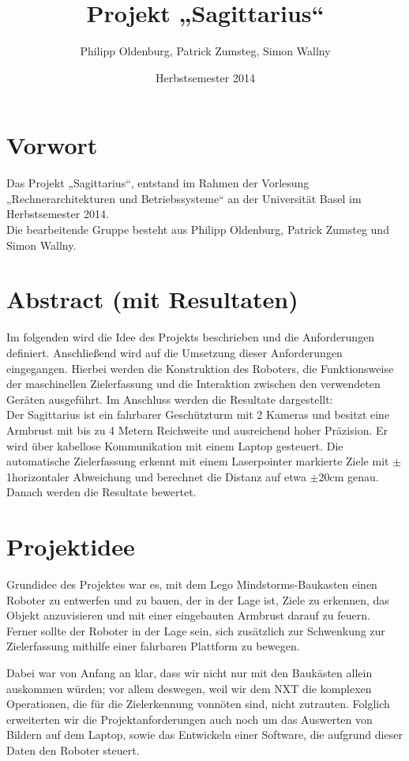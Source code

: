 \documentclass[12pt,a4paper]{article}
\author{Philipp Oldenburg, Patrick Zumsteg, Simon Wallny}
\title{Projekt „Sagittarius“}
\date{Herbstsemester 2014}
\begin{document}
\maketitle
\tableofcontents
\section{Vorwort}
Das Projekt „Sagittarius“, entstand im Rahmen der Vorlesung „Rechnerarchitekturen und Betriebssysteme“ an der Universität Basel im Herbstsemester 2014.\hfill\\
Die bearbeitende Gruppe besteht aus Philipp Oldenburg, Patrick Zumsteg und Simon Wallny.
\newpage
\section{Abstract (mit Resultaten)}
Im folgenden wird die Idee des Projekts beschrieben und die Anforderungen definiert. Anschließend wird auf die Umsetzung dieser Anforderungen eingegangen. Hierbei werden die Konstruktion des Roboters, die Funktionsweise der maschinellen Zielerfassung und die Interaktion zwischen den verwendeten Geräten ausgeführt. Im Anschluss werden die Resultate dargestellt:\hfill\\
Der Sagittarius ist ein fahrbarer Geschützturm mit 2 Kameras und besitzt eine Armbrust mit bis zu 4 Metern Reichweite und ausreichend hoher Präzision. Er wird über kabellose Kommunikation mit einem Laptop gesteuert. Die automatische Zielerfassung erkennt mit einem Laserpointer markierte Ziele mit $\pm$1\degree horizontaler Abweichung und berechnet die Distanz auf etwa $\pm$20cm genau.\hfill\\
Danach werden die Resultate bewertet.

\section{Projektidee}

Grundidee des Projektes war es, mit dem Lego Mindstorms-Baukasten einen Roboter zu entwerfen und zu bauen, der in der Lage ist, Ziele zu erkennen, das Objekt anzuvisieren und mit einer eingebauten Armbrust darauf zu feuern.
Ferner sollte der Roboter in der Lage sein, sich zusätzlich zur Schwenkung zur Zielerfassung mithilfe einer fahrbaren Plattform zu bewegen.

Dabei war von Anfang an klar, dass wir nicht nur mit den Baukästen allein auskommen würden; vor allem deswegen, weil wir dem NXT die komplexen Operationen, die für die Zielerkennung vonnöten sind, nicht zutrauten. Folglich erweiterten wir die Projektanforderungen auch noch um das Auswerten von Bildern auf dem Laptop, sowie das Entwickeln einer Software, die aufgrund dieser Daten den Roboter steuert.
\end{document}
